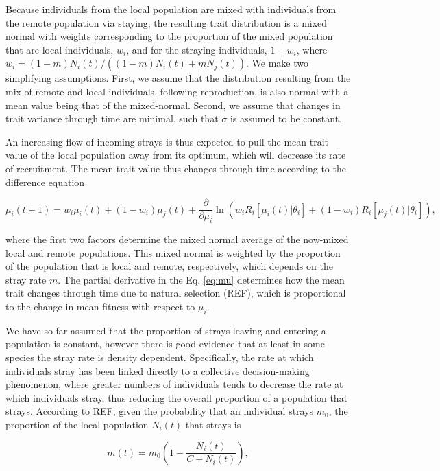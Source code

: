 \documentclass[onecolumn,preprintnumbers,amsmath,amssymb,superscriptaddress]{revtex4}
\begin{document}
Because individuals from the local population are mixed with individuals from the remote population via staying, the resulting trait distribution is a mixed normal with weights corresponding to the proportion of the mixed population that are local individuals, $w_i$, and for the straying individuals, $1-w_i$, where $w_i=(1-m)N_i(t)/((1-m) N_i(t) + m N_j(t))$.
We make two simplifying assumptions.
First, we assume that the distribution resulting from the mix of remote and local individuals, following reproduction, is also normal with a mean value being that of the mixed-normal.
Second, we assume that changes in trait variance through time are minimal, such that $\sigma$ is assumed to be constant.

An increasing flow of incoming strays is thus expected to pull the mean trait value of the local population away from its optimum, which will decrease its rate of recruitment.
The mean trait value thus changes through time according to the difference equation

\begin{equation}
  \mu_i(t+1) = w_i\mu_i(t) + (1-w_i)\mu_j(t) + \frac{\partial}{\partial \mu_i}\ln\left(w_i R_i[\mu_i(t)|\theta_i] + (1-w_i)R_i[\mu_j(t)|\theta_i]  \right),
  \label{eq:mu}
\end{equation}

\noindent where the first two factors determine the mixed normal average of the now-mixed local and remote populations.
This mixed normal is weighted by the proportion of the population that is local and remote, respectively, which depends on the stray rate $m$.
The partial derivative in the Eq. \ref{eq:mu} determines how the mean trait changes through time due to natural selection (REF), which is proportional to the change in mean fitness with respect to $\mu_i$.


We have so far assumed that the proportion of strays leaving and entering a population is constant, however there is good evidence that at least in some species the stray rate is density dependent.
Specifically, the rate at which individuals stray has been linked directly to a collective decision-making phenomenon, where greater numbers of individuals tends to decrease the rate at which individuals stray, thus reducing the overall proportion of a population that strays.
According to REF, given the probability that an individual strays $m_0$, the proportion of the local population $N_i(t)$ that strays is

\begin{equation}
  m(t) = m_0\left(1- \frac{N_i(t)}{C+N_i(t)}\right),
  \label{eq:ddm}
\end{equation}
\end{document}
